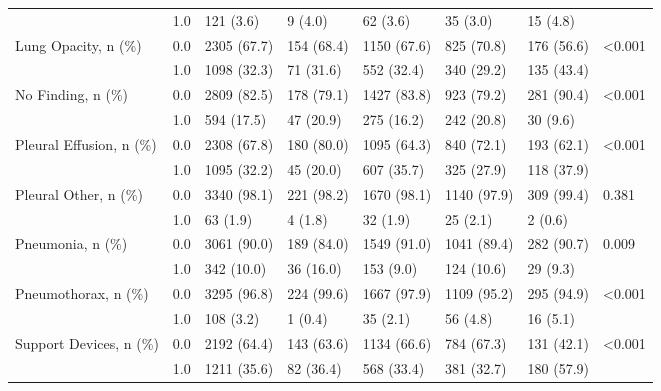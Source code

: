 \begin{tabular}{llllllll}
                       & 1.0 &            121 (3.6) &     9 (4.0) &     62 (3.6) &     35 (3.0) &    15 (4.8) &         \\
Lung Opacity, n (\%) & 0.0 &          2305 (67.7) &  154 (68.4) &  1150 (67.6) &   825 (70.8) &  176 (56.6) &  <0.001 \\
                       & 1.0 &          1098 (32.3) &   71 (31.6) &   552 (32.4) &   340 (29.2) &  135 (43.4) &         \\
No Finding, n (\%) & 0.0 &          2809 (82.5) &  178 (79.1) &  1427 (83.8) &   923 (79.2) &  281 (90.4) &  <0.001 \\
                       & 1.0 &           594 (17.5) &   47 (20.9) &   275 (16.2) &   242 (20.8) &    30 (9.6) &         \\
Pleural Effusion, n (\%) & 0.0 &          2308 (67.8) &  180 (80.0) &  1095 (64.3) &   840 (72.1) &  193 (62.1) &  <0.001 \\
                       & 1.0 &          1095 (32.2) &   45 (20.0) &   607 (35.7) &   325 (27.9) &  118 (37.9) &         \\
Pleural Other, n (\%) & 0.0 &          3340 (98.1) &  221 (98.2) &  1670 (98.1) &  1140 (97.9) &  309 (99.4) &   0.381 \\
                       & 1.0 &             63 (1.9) &     4 (1.8) &     32 (1.9) &     25 (2.1) &     2 (0.6) &         \\
Pneumonia, n (\%) & 0.0 &          3061 (90.0) &  189 (84.0) &  1549 (91.0) &  1041 (89.4) &  282 (90.7) &   0.009 \\
                       & 1.0 &           342 (10.0) &   36 (16.0) &    153 (9.0) &   124 (10.6) &    29 (9.3) &         \\
Pneumothorax, n (\%) & 0.0 &          3295 (96.8) &  224 (99.6) &  1667 (97.9) &  1109 (95.2) &  295 (94.9) &  <0.001 \\
                       & 1.0 &            108 (3.2) &     1 (0.4) &     35 (2.1) &     56 (4.8) &    16 (5.1) &         \\
Support Devices, n (\%) & 0.0 &          2192 (64.4) &  143 (63.6) &  1134 (66.6) &   784 (67.3) &  131 (42.1) &  <0.001 \\
                       & 1.0 &          1211 (35.6) &   82 (36.4) &   568 (33.4) &   381 (32.7) &  180 (57.9) &         \\
\bottomrule
\end{tabular}
